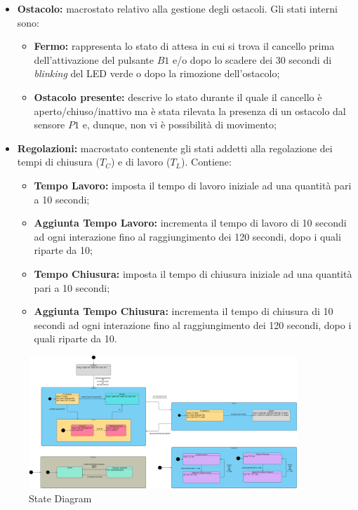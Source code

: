 \begin{itemize}
    \item \textbf{Ostacolo:} macrostato relativo alla gestione degli ostacoli. Gli stati interni sono:
        \begin{itemize}
            \item \textbf{Fermo:} rappresenta lo stato di attesa in cui si trova il cancello prima dell'attivazione del pulsante $B1$ e/o dopo lo scadere dei 30 secondi di \textit{blinking} del LED verde o dopo la rimozione dell'ostacolo;
        
            \item \textbf{Ostacolo presente:} descrive lo stato durante il quale il cancello è aperto/chiuso/inattivo ma è stata rilevata la presenza di un ostacolo dal sensore $P1$ e, dunque, non vi è possibilità di movimento;
        \end{itemize}

    \item \textbf{Regolazioni:} macrostato contenente gli stati addetti alla regolazione dei tempi di chiusura ($T_C$) e di lavoro ($T_L$). Contiene:
        \begin{itemize}
            \item \textbf{Tempo Lavoro:} imposta il tempo di lavoro iniziale ad una quantità pari a 10 secondi;

            \item \textbf{Aggiunta Tempo Lavoro:} incrementa il tempo di lavoro di 10 secondi ad ogni interazione fino al raggiungimento dei 120 secondi, dopo i quali riparte da 10;

            \item \textbf{Tempo Chiusura:} imposta il tempo di chiusura iniziale ad una quantità pari a 10 secondi;

            \item \textbf{Aggiunta Tempo Chiusura:} incrementa il tempo di chiusura di 10 secondi ad ogni interazione fino al raggiungimento dei 120 secondi, dopo i quali riparte da 10.
        \end{itemize}
\end{itemize}

\vspace{10mm}

\begin{figure}[H]
    \centering
    \includegraphics[width=0.9\textwidth]{figures/statediagram.png}
    \caption{State Diagram}
    \label{state}
\end{figure}


